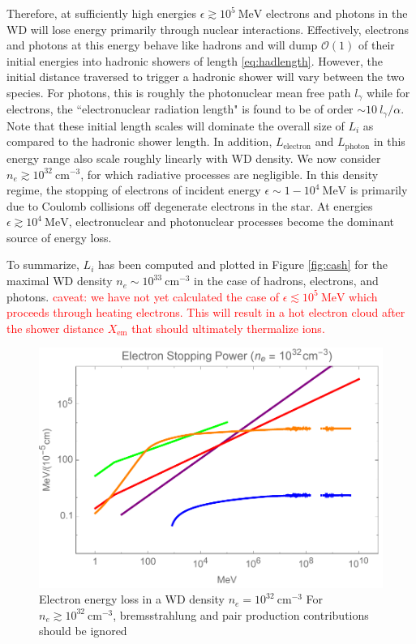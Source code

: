 \documentclass[twocolumn,showpacs,preprintnumbers,amsmath,amssymb,prd]{revtex4}
\newcommand{\OO}{\mathcal{O}}
\begin{document}
Therefore, at sufficiently high energies $\epsilon \gtrsim 10^5 ~\text{MeV}$ electrons and photons in the WD will lose energy primarily through nuclear interactions. Effectively, electrons and photons at this energy behave like hadrons and will dump $\OO(1)$ of their initial energies into hadronic showers of length \eqref{eq:hadlength}. However, the initial distance traversed to trigger a hadronic shower will vary between the two species. For photons, this is roughly the photonuclear mean free path $l_\gamma$ while for electrons, the ``electronuclear radiation length" is found to be of order $\sim 10  ~l_\gamma/\alpha$. Note that these initial length scales will dominate the overall size of $L_i$ as compared to the hadronic shower length. In addition, $L_\text{electron}$ and $L_\text{photon}$ in this energy range also scale roughly linearly with WD density. We now consider $n_e \gtrsim 10^{32} ~\text{cm}^{-3}$, for which radiative processes are negligible. In this density regime, the stopping of electrons of incident energy $\epsilon \sim 1 - 10^4 ~\text{MeV}$ is primarily due to Coulomb collisions off degenerate electrons in the star. At energies $\epsilon \gtrsim 10^4 ~\text{MeV}$, electronuclear and photonuclear processes become the dominant source of energy loss. 

To summarize, $L_i$ has been computed and plotted in Figure \ref{fig:cash} for the maximal WD density $n_e \sim 10^{33} ~\text{cm}^{-3}$ in the case of hadrons, electrons, and photons. \textcolor{red}{caveat: we have not yet calculated the case of $\epsilon \lesssim 10^{5} ~\text{MeV}$ which proceeds through heating electrons. This will result in a hot electron cloud after the shower distance $X_\text{em}$ that should ultimately thermalize ions.}

\begin{figure}
\includegraphics[scale=.45]{SPelectron.pdf}
\caption{Electron energy loss in a WD density $n_e = 10^{32} ~\text{cm}^{-3}$ For $n_e \gtrsim 10^{32} ~\text{cm}^{-3}$, bremsstrahlung and pair production contributions should be ignored}
\label{fig:SPelectron}
\end{figure}
\end{document}
